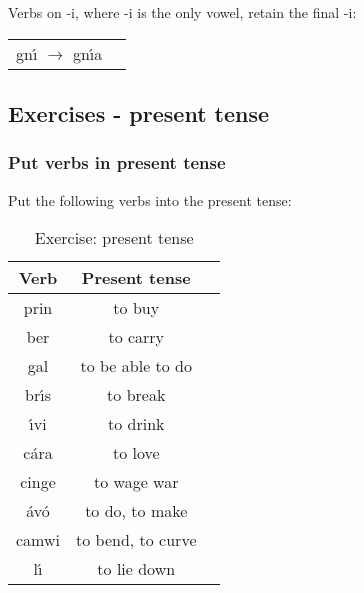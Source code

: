 Verbs on -i, where -i is the only vowel, retain the final -i:
\begin{table}[H]
\begin{tabular}{ll}
  gn\'{\i} $\rightarrow$ gn\'{\i}a
\end{tabular}
\label{examples_verbs_on_i_only_vowel}
\end{table}

\newpage
\subsection{Exercises - present tense}
\subsubsection{Put verbs in present tense}
Put the following verbs into the present tense:
\begin{table}[H]
\centering
\begin{tabular}{|c|c|M{10.0cm}|}
  \toprule
  \textbf{Verb} & \textbf{Present tense}\\
  \toprule
  prin & to buy & \\
  \midrule
  ber & to carry & \\
  \midrule
  gal & to be able to do & \\
  \midrule
  br\'{\i}s & to break & \\
  \midrule
  \'{\i}vi & to drink & \\
  \midrule
  c\'{a}ra & to love & \\
  \midrule
  cinge & to wage war & \\
  \midrule
  \'{a}v\'{o} & to do, to make & \\
  \midrule
  camwi & to bend, to curve & \\
  \midrule
  l\'{\i} & to lie down & \\
  \bottomrule
\end{tabular}
\caption{Exercise: present tense}
\label{exercise_present_tense}
\end{table}

\newpage
